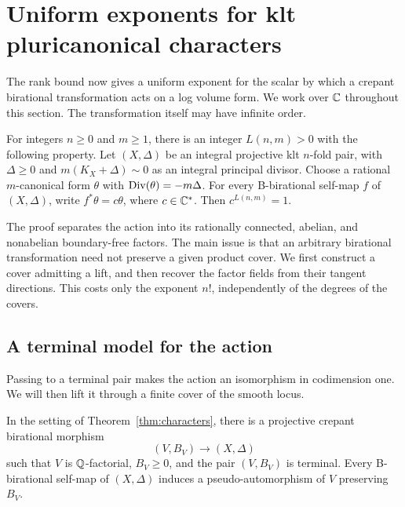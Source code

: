 \section{Uniform exponents for klt pluricanonical characters}
\label{sec:characters}

The rank bound now gives a uniform exponent for the scalar by which a
crepant birational transformation acts on a log volume form.  We work
over $\mathbb C$ throughout this section.  The transformation itself may have
infinite order.

\begin{theorem}\label{thm:characters}
For integers $n\geq0$ and $m\geq1$, there is an integer $L(n,m)>0$
with the following property.  Let $(X,\Delta)$ be an integral
projective klt $n$-fold pair, with $\Delta\geq0$ and
$m(K_X+\Delta)\sim0$ as an integral principal divisor.  Choose a
rational $m$-canonical form $\theta$ with
$\operatorname{Div}(\theta)=-m\Delta$.  For every B-birational self-map $f$ of
$(X,\Delta)$, write $f^*\theta=c\theta$, where $c\in\mathbb C^*$.
Then $c^{L(n,m)}=1$.
\end{theorem}

The proof separates the action into its rationally connected,
abelian, and nonabelian boundary-free factors.  The main issue is that
an arbitrary birational transformation need not preserve a given
product cover.  We first construct a cover admitting a lift, and then
recover the factor fields from their tangent directions.  This costs
only the exponent $n!$, independently of the degrees of the covers.

\subsection{A terminal model for the action}

Passing to a terminal pair makes the action an isomorphism in
codimension one.  We will then lift it through a finite cover of
the smooth locus.

\begin{lemma}\label{char:terminal-model}
In the setting of Theorem~\ref{thm:characters}, there is a projective
crepant birational morphism
\[
                 (V,B_V)\longrightarrow(X,\Delta)
\]
such that $V$ is $\mathbb Q$-factorial, $B_V\geq0$, and the pair $(V,B_V)$
is terminal.  Every B-birational self-map of $(X,\Delta)$ induces a
pseudo-automorphism of $V$ preserving $B_V$.
\end{lemma}

